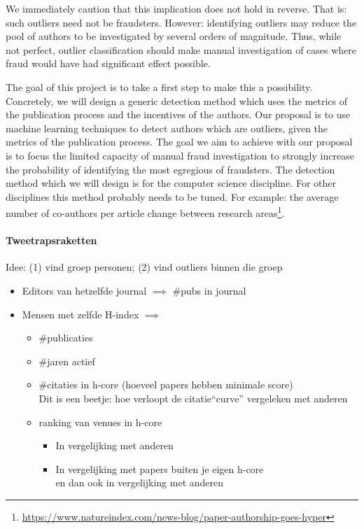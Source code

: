 \documentclass{ou-report}
\newcommand{\outline}[1]{{\color{blue} #1}}
\begin{document}
We immediately caution that this implication does not hold in reverse. That is: 
such outliers need not be fraudsters. 
However: identifying outliers may reduce the pool of authors to be investigated
by several orders of magnitude. Thus, while not perfect, outlier classification
should make manual investigation of cases where fraud would have had significant
effect possible.

The goal of this project is to take a first step to make this a possibility.
Concretely, we will design a generic detection method which uses the metrics
of the publication process and the incentives of the authors. Our proposal is to 
use machine learning techniques to detect authors which are outliers, given the 
metrics of the publication process. The goal we aim to achieve with our proposal 
is to focus the limited capacity of manual fraud investigation to strongly 
increase the probability of identifying the most egregious of fraudsters. 
The detection method which we will design is for the computer science 
discipline. For other disciplines this method probably needs to be tuned. For 
example: the average number of co-authors per article change between research 
areas\footnote{\url{https://www.natureindex.com/news-blog/paper-authorship-goes-hyper}}.

\outline{
\paragraph{Tweetrapsraketten}
Idee: (1) vind groep personen; (2) vind outliers binnen die groep
\begin{itemize}
\item Editors van hetzelfde journal $\implies$ \#pubs in journal
\item Mensen met zelfde H-index  $\implies$
    \begin{itemize}
    \item \#publicaties
    \item \#jaren actief
    \item \#citaties in h-core (hoeveel papers hebben minimale score) \\
        Dit is een beetje: hoe verloopt de citatie``curve'' vergeleken met anderen
    \item ranking van venues in h-core
        \begin{itemize}
        \item In vergelijking met anderen
        \item In vergelijking met papers buiten je eigen h-core \\
            en dan ook in vergelijking met anderen
        \end{itemize}
        
    \end{itemize}
\end{itemize}
}
\end{document}
